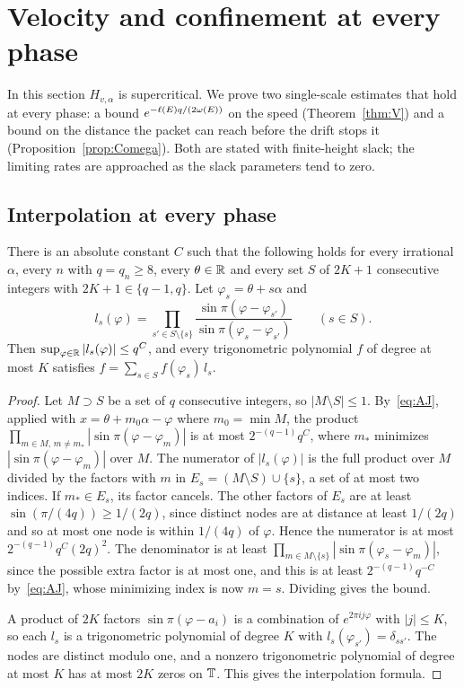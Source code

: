 \section{Velocity and confinement at every phase}\label{sec:velocity}

In this section $H_{v,\alpha}$ is supercritical. We prove two single-scale estimates that hold at every phase: a bound $e^{-\ell(E)q/(2\omega(E))}$ on the speed (Theorem~\ref{thm:V}) and a bound on the distance the packet can reach before the drift stops it (Proposition~\ref{prop:Comega}). Both are stated with finite-height slack; the limiting rates are approached as the slack parameters tend to zero.

\subsection{Interpolation at every phase}

\begin{lemma}\label{lem:TI}
There is an absolute constant $C$ such that the following holds for every irrational $\alpha$, every $n$ with $q=q_n\ge8$, every $\theta\in\mathbb R$ and every set $S$ of $2K+1$ consecutive integers with $2K+1\in\{q-1,q\}$. Let $\varphi_s=\theta+s\alpha$ and
\[
l_s(\varphi)=\prod_{s'\in S\setminus\{s\}}\frac{\sin\pi(\varphi-\varphi_{s'})}{\sin\pi(\varphi_s-\varphi_{s'})}\qquad(s\in S).
\]
Then $\sup_{\varphi\in\mathbb R}|l_s(\varphi)|\le q^C$, and every trigonometric polynomial $f$ of degree at most $K$ satisfies $f=\sum_{s\in S}f(\varphi_s)\,l_s$.
\end{lemma}

\begin{proof}
Let $M\supset S$ be a set of $q$ consecutive integers, so $|M\setminus S|\le1$. By~\eqref{eq:AJ}, applied with $x=\theta+m_0\alpha-\varphi$ where $m_0=\min M$, the product $\prod_{m\in M,\,m\ne m_*}|\sin\pi(\varphi-\varphi_m)|$ is at most $2^{-(q-1)}q^{C}$, where $m_*$ minimizes $|\sin\pi(\varphi-\varphi_m)|$ over $M$. The numerator of $|l_s(\varphi)|$ is the full product over $M$ divided by the factors with $m$ in $E_s=(M\setminus S)\cup\{s\}$, a set of at most two indices. If $m_*\in E_s$, its factor cancels. The other factors of $E_s$ are at least $\sin(\pi/(4q))\ge1/(2q)$, since distinct nodes are at distance at least $1/(2q)$ and so at most one node is within $1/(4q)$ of $\varphi$. Hence the numerator is at most $2^{-(q-1)}q^C(2q)^2$. The denominator is at least $\prod_{m\in M\setminus\{s\}}|\sin\pi(\varphi_s-\varphi_m)|$, since the possible extra factor is at most one, and this is at least $2^{-(q-1)}q^{-C}$ by~\eqref{eq:AJ}, whose minimizing index is now $m=s$. Dividing gives the bound.

A product of $2K$ factors $\sin\pi(\varphi-a_i)$ is a combination of $e^{2\pi ij\varphi}$ with $|j|\le K$, so each $l_s$ is a trigonometric polynomial of degree $K$ with $l_s(\varphi_{s'})=\delta_{ss'}$. The nodes are distinct modulo one, and a nonzero trigonometric polynomial of degree at most $K$ has at most $2K$ zeros on $\mathbb T$. This gives the interpolation formula.
\end{proof}


